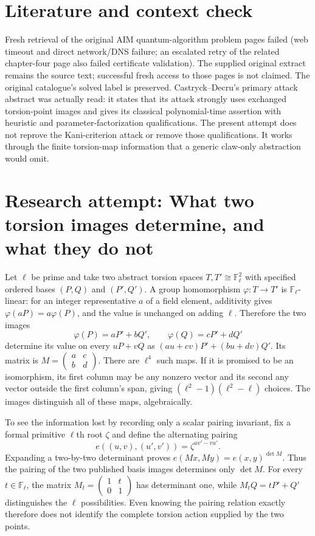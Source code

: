 \documentclass[11pt]{article}
\begin{document}
\section{Literature and context check}
Fresh retrieval of the original AIM quantum-algorithm problem pages failed (web timeout and direct network/DNS failure; an escalated retry of the related chapter-four page also failed certificate validation). The supplied original extract remains the source text; successful fresh access to those pages is not claimed. The original catalogue's solved label is preserved. Castryck--Decru's primary attack abstract was actually read: it states that its attack strongly uses exchanged torsion-point images and gives its classical polynomial-time assertion with heuristic and parameter-factorization qualifications. The present attempt does not reprove the Kani-criterion attack or remove those qualifications. It works through the finite torsion-map information that a generic claw-only abstraction would omit.
\section{Research attempt: What two torsion images determine, and what they do not}
Let $\ell$ be prime and take two abstract torsion spaces $T,T'\cong\mathbb F_\ell^2$ with specified ordered bases $(P,Q)$ and $(P',Q')$. A group homomorphism $\varphi:T\to T'$ is $\mathbb F_\ell$-linear: for an integer representative $a$ of a field element, additivity gives $\varphi(aP)=a\varphi(P)$, and the value is unchanged on adding $\ell$. Therefore the two images
\[
 \varphi(P)=aP'+bQ',\qquad \varphi(Q)=cP'+dQ'
\]
determine its value on every $uP+vQ$ as $(au+cv)P'+(bu+dv)Q'$. Its matrix is $M=\begin{pmatrix}a&c\\b&d\end{pmatrix}$. There are $\ell^4$ such maps. If it is promised to be an isomorphism, its first column may be any nonzero vector and its second any vector outside the first column's span, giving $(\ell^2-1)(\ell^2-\ell)$ choices. The images distinguish all of these maps, algebraically.

To see the information lost by recording only a scalar pairing invariant, fix a formal primitive $\ell$th root $\zeta$ and define the alternating pairing
\[
 e((u,v),(u',v'))=\zeta^{uv'-vu'}.
\]
Expanding a two-by-two determinant proves
$e(Mx,My)=e(x,y)^{\det M}$. Thus the pairing of the two published basis images determines only $\det M$. For every $t\in\mathbb F_\ell$, the matrix
$M_t=\begin{pmatrix}1&t\\0&1\end{pmatrix}$ has determinant one, while $M_tQ=tP'+Q'$ distinguishes the $\ell$ possibilities. Even knowing the pairing relation exactly therefore does not identify the complete torsion action supplied by the two points.
\end{document}
